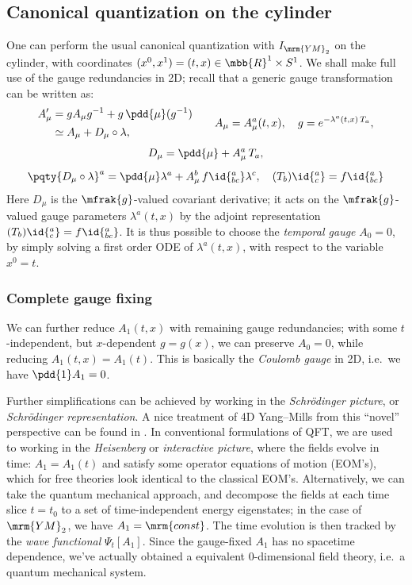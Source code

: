 \documentclass[a4paper
	,10pt
]{article}
\newcommand{\YM}{{\ensuremath{\mrm{YM}_2}}\xspace}
\begin{document}
\subsection{Canonical quantization on the cylinder}
	One can perform the usual canonical quantization with $I_\YM$ on the cylinder, with coordinates $(x^0,x^1) = (t,x) \in \mbb{R}^1\times S^1$. We shall make full use of the gauge redundancies in 2D; recall that a generic gauge transformation can be written as:
	\begin{equation}
	\begin{aligned}
		A'_\mu
		&= g A_\mu g^{-1}
			+ g\,\pdd{\mu} (g^{-1}) \\
		&\simeq A_\mu
			+ D_\mu\circ\lambda,
	\end{aligned}
	\qquad
		A_\mu = A^a_\mu(t,x),
	\quad
		g = e^{-\lambda^a(t,x)\,T_a},
	\end{equation}
	\vspace{-1.2\baselineskip}
	\begin{gather}
		D_\mu = \pdd{\mu} + A_\mu^a\,T_a,
	\\[1ex]
		\pqty{D_\mu\circ\lambda}^a
		= \pdd{\mu} \lambda^a
			+ A_\mu^b\,f\id{^a_{bc}} \lambda^c,
	\quad
		(T_b)\id{^a_c} = f\id{^a_{bc}}
	\end{gather}
	Here $D_\mu$ is the $\mfrak{g}$-valued covariant derivative; it acts on the $\mfrak{g}$-valued gauge parameters $\lambda^a(t,x)$ by the adjoint representation $(T_b)\id{^a_c} = f\id{^a_{bc}}$. 
	It is thus possible to choose the \textit{temporal gauge} $A_0 = 0$, by simply solving a first order ODE of $\lambda^a(t,x)$, with respect to the variable $x^0 = t$. 
\subsubsection{Complete gauge fixing}
	We can further reduce $A_1(t,x)$ with remaining gauge redundancies; with some $t$-independent, but $x$-dependent $g = g(x)$, we can preserve $A_0 = 0$, while reducing $A_1(t,x) = A_1(t)$. This is basically the \textit{Coulomb gauge} in 2D, i.e.~we have $\pdd{1} A_1 = 0$. 
	
	Further simplifications can be achieved by working in the \textit{Schr\"odinger picture}, or \textit{Schr\"odinger representation}. A nice treatment of 4D Yang--Mills from this ``novel'' perspective can be found in \cite{Hatfield:234595}. In conventional formulations of QFT, we are used to working in the \textit{Heisenberg} or \textit{interactive picture}, where the fields evolve in time: $A_1 = A_1(t)$ and satisfy some operator equations of motion (EOM's), which for free theories look identical to the classical EOM's. Alternatively, we can take the quantum mechanical approach, and decompose the fields at each time slice $t = t_0$ to a set of time-independent energy eigenstates; in the case of \YM, we have $A_1 = \mrm{const}$. 
	The time evolution is then tracked by the \textit{wave functional} $\Psi_t[A_1]$. Since the gauge-fixed $A_1$ has no spacetime dependence, we've actually obtained a equivalent 0-dimensional field theory, i.e.~a quantum mechanical system. 
	
\end{document}
